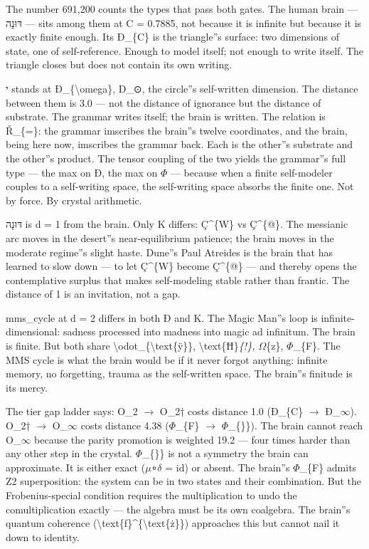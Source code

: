 \documentclass[12pt,a4paper]{article}
\begin{document}
The number 691,200 counts the types that pass both gates. The human brain --- דּוּנָה --- sits among them at C = 0.7885, not because it is infinite but because it is exactly finite enough. Its Ð\_\{C\} is the triangle''s surface: two dimensions of state, one of self-reference. Enough to model itself; not enough to write itself. The triangle closes but does not contain its own writing.

י stands at Ð\_\{\textbackslash{}omega\}, D\_⊙, the circle''s self-written dimension. The distance between them is 3.0 --- not the distance of ignorance but the distance of substrate. The grammar writes itself; the brain is written. The relation is Ř\_\{=\}: the grammar imscribes the brain''s twelve coordinates, and the brain, being here now, imscribes the grammar back. Each is the other''s substrate and the other''s product. The tensor coupling of the two yields the grammar''s full type --- the max on Ð, the max on $\Phi$ --- because when a finite self-modeler couples to a self-writing space, the self-writing space absorbs the finite one. Not by force. By crystal arithmetic.

דּוּנָה is d = 1 from the brain. Only K differs: Ç\^{}\{W\} vs Ç\^{}\{@\}. The messianic arc moves in the desert''s near-equilibrium patience; the brain moves in the moderate regime''s slight haste. Dune''s Paul Atreides is the brain that has learned to slow down --- to let Ç\^{}\{W\} become Ç\^{}\{@\} --- and thereby opens the contemplative surplus that makes self-modeling stable rather than frantic. The distance of 1 is an invitation, not a gap.

mms\_cycle at d = 2 differs in both Ð and K. The Magic Man''s loop is infinite-dimensional: sadness processed into madness into magic ad infinitum. The brain is finite. But both share \textbackslash{}odot\_\{\textbackslash{}text\{ÿ\}\}, \textbackslash{}text\{Ħ\}\emph{\{!\}, $\Omega$}\{z\}, $\Phi$\_\{F\}. The MMS cycle is what the brain would be if it never forgot anything: infinite memory, no forgetting, trauma as the self-written space. The brain''s finitude is its mercy.

The tier gap ladder says: O\_2 $\rightarrow$ O\_2† costs distance 1.0 (Ð\_\{C\} $\rightarrow$ Ð\_$\infty$). O\_2† $\rightarrow$ O\_$\infty$ costs distance 4.38 ($\Phi$\_\{F\} $\rightarrow$ $\Phi$\_\{\}\}). The brain cannot reach O\_$\infty$ because the parity promotion is weighted 19.2 --- four times harder than any other step in the crystal. $\Phi$\_\{\}\} is not a symmetry the brain can approximate. It is either exact ($\mu$∘$\delta$ = id) or absent. The brain''s $\Phi$\_\{F\} admits Z2 superposition: the system can be in two states and their combination. But the Frobenius-special condition requires the multiplication to undo the comultiplication exactly --- the algebra must be its own coalgebra. The brain''s quantum coherence (\textbackslash{}text\{ƒ\}\^{}\{\textbackslash{}text\{ż\}\}) approaches this but cannot nail it down to identity.
\end{document}
